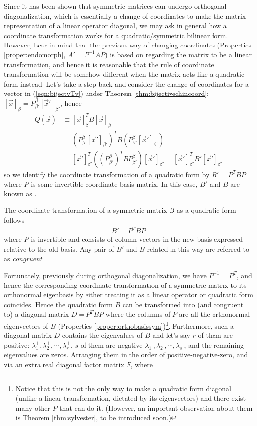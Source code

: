Since it has been shown that symmetric matrices can undergo orthogonal diagonalization, which is essentially a change of coordinates to make the matrix representation of a linear operator diagonal, we may ask in general how a coordinate transformation works for a quadratic/symmetric bilinear form. However, bear in mind that the previous way of changing coordinates (Properties \ref{proper:endomorph}, $A' = P^{-1}AP$) is based on regarding the matrix to be a linear transformation, and hence it is reasonable that the rule of coordinate transformation will be somehow different when the matrix acts like a quadratic form instead. Let's take a step back and consider the change of coordinates for a vector in (\ref{eqn:bijectvTv}) under Theorem \ref{thm:bijectivechincoord}: $[\vec{x}]_\beta = P_{\beta'}^\beta [\vec{x}']_{\beta'}$, hence
\begin{align*}
Q(\vec{x}) &\equiv [\vec{x}]_\beta^T B [\vec{x}]_\beta \\
&= (P_{\beta'}^\beta [\vec{x}']_{\beta'})^T B (P_{\beta'}^\beta [\vec{x}']_{\beta'}) \\
&= [\vec{x}']_{\beta'}^T ((P_{\beta'}^\beta)^T B P_{\beta'}^\beta) [\vec{x}']_{\beta'} = [\vec{x}']_{\beta'}^T B' [\vec{x}']_{\beta'} 
\end{align*}
so we identify the coordinate transformation of a quadratic form by $B' = P^TBP$ where $P$ is some invertible coordinate basis matrix. In this case, $B'$ and $B$ are known as .
\begin{defn}
\label{defn:coordtransquad}
The coordinate transformation of a symmetric matrix $B$ as a quadratic form follows
\begin{align}
B' = P^TBP
\end{align}
where $P$ is invertible and consists of column vectors in the new basis expressed relative to the old basis. Any pair of $B'$ and $B$ related in this way are referred to as \textit{congruent}.
\end{defn}
Fortunately, previously during orthogonal diagonalization, we have $P^{-1} = P^T$, and hence the corresponding coordinate transformation of a symmetric matrix to its orthonormal eigenbasis by either treating it as a linear operator or quadratic form coincides. Hence the quadratic form $B$ can be transformed into (and congruent to) a diagonal matrix $D = P^TBP$ where the columns of $P$ are all the orthonormal eigenvectors of $B$ (Properties \ref{proper:orthobasissym})\footnote{Notice that this is not the only way to make a quadratic form diagonal (unlike a linear transformation, dictated by its eigenvectors) and there exist many other $P$ that can do it. (However, an important observation about them is Theorem \ref{thm:sylvester}, to be introduced soon.)}. Furthermore, such a diagonal matrix $D$ contains the eigenvalues of $B$ and let's say $r$ of them are positive: $\lambda_1^+, \lambda_2^+, \cdots, \lambda_r^+$, $s$ of them are negative $\lambda_1^-,  \lambda_2^-, \cdots, \lambda_s^-$, and the remaining eigenvalues are zeros. Arranging them in the order of positive-negative-zero, and via an extra real diagonal factor matrix $F$, where
